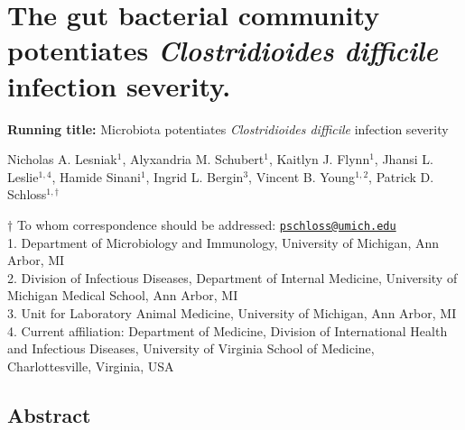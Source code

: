 \documentclass[
  12pt,
]{article}
\author{}
\date{\vspace{-2.5em}}
\begin{document}
\hypertarget{the-gut-bacterial-community-potentiates-clostridioides-difficile-infection-severity.}{%
\section{\texorpdfstring{The gut bacterial community potentiates
\emph{Clostridioides difficile} infection
severity.}{The gut bacterial community potentiates Clostridioides difficile infection severity.}}\label{the-gut-bacterial-community-potentiates-clostridioides-difficile-infection-severity.}}

\vspace{30mm}

\textbf{Running title:} Microbiota potentiates \emph{Clostridioides
difficile} infection severity

\vspace{20mm}

Nicholas A. Lesniak\(^1\), Alyxandria M. Schubert\(^1\), Kaitlyn J.
Flynn\(^1\), Jhansi L. Leslie\(^{1,4}\), Hamide Sinani\(^1\), Ingrid L.
Bergin\(^3\), Vincent B. Young\(^{1,2}\), Patrick D.
Schloss\(^{1,\dagger}\)

\vspace{30mm}

\(\dagger\) To whom correspondence should be addressed:
\href{mailto:pschloss@umich.edu}{\nolinkurl{pschloss@umich.edu}}\\
1. Department of Microbiology and Immunology, University of Michigan,
Ann Arbor, MI\\
2. Division of Infectious Diseases, Department of Internal Medicine,
University of Michigan Medical School, Ann Arbor, MI\\
3. Unit for Laboratory Animal Medicine, University of Michigan, Ann
Arbor, MI\\
4. Current affiliation: Department of Medicine, Division of
International Health and Infectious Diseases, University of Virginia
School of Medicine, Charlottesville, Virginia, USA

\newpage

\hypertarget{abstract}{%
\subsection{Abstract}\label{abstract}}
\end{document}
